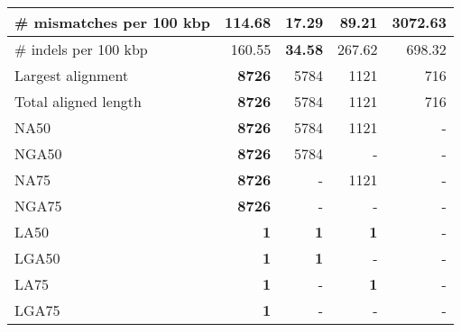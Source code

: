 \documentclass[12pt,a4paper]{article}
\begin{document}
\begin{table}[ht]
\begin{center}
\begin{tabular}{|l*{4}{|r}|}
\# mismatches per 100 kbp & 114.68 & {\bf 17.29} & 89.21 & 3072.63 \\ \hline
\# indels per 100 kbp & 160.55 & {\bf 34.58} & 267.62 & 698.32 \\ \hline
Largest alignment & {\bf 8726} & 5784 & 1121 & 716 \\ \hline
Total aligned length & {\bf 8726} & 5784 & 1121 & 716 \\ \hline
NA50 & {\bf 8726} & 5784 & 1121 & - \\ \hline
NGA50 & {\bf 8726} & 5784 & - & - \\ \hline
NA75 & {\bf 8726} & - & 1121 & - \\ \hline
NGA75 & {\bf 8726} & - & - & - \\ \hline
LA50 & {\bf 1} & {\bf 1} & {\bf 1} & - \\ \hline
LGA50 & {\bf 1} & {\bf 1} & - & - \\ \hline
LA75 & {\bf 1} & - & {\bf 1} & - \\ \hline
LGA75 & {\bf 1} & - & - & - \\ \hline
\end{tabular}
\end{center}
\end{table}
\end{document}
